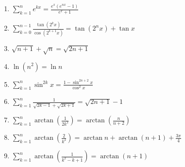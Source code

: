 \documentclass[11pt,a4paper]{article}
\begin{document}
\begin{enumerate}
\item $\displaystyle \sum_{k=1}^{n} e^{k x} = \frac{e^{x}\left(e^{n x} - 1\right)}{e^{x} + 1}$
\item $\displaystyle \sum_{k=0}^{n - 1} \frac{\tan\left(2^{k}x\right)}{\cos\left(2^{k + 1}x\right)} = \tan\left(2^{n}x\right) + \tan x$
\item $\displaystyle \sqrt{n + 1} + \sqrt{n} = \sqrt{2n + 1}$
\item $\displaystyle \ln\left(n^{2}\right) = \ln n$
\item $\displaystyle \sum_{k=1}^{n} \sin^{2k} x = \frac{1 - \sin^{2n + 2} x}{\cos^{2} x}$
\item $\displaystyle \sum_{k=1}^{n} \frac{1}{\sqrt{2k - 1} + \sqrt{2k + 1}} = \sqrt{2n + 1} - 1$
\item $\displaystyle \sum_{k=1}^{n} \arctan\left(\frac{1}{2k^{2}}\right) = \arctan\left(\frac{n}{n + 2}\right)$
\item $\displaystyle \sum_{k=1}^{n} \arctan\left(\frac{2}{k^{2}}\right) = \arctan n + \arctan\left(n + 1\right) + \frac{3\pi}{4}$
\item $\displaystyle \sum_{k=1}^{n} \arctan\left(\frac{1}{k^{2} - k + 1}\right) = \arctan\left(n + 1\right)$
\end{enumerate}
\end{document}
